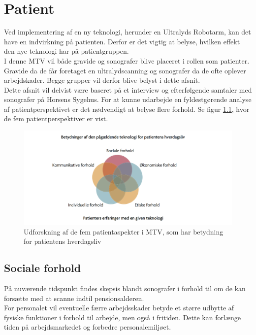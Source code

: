 \chapter{Patient}
Ved implementering af en ny teknologi, herunder en Ultralyds Robotarm, kan det have en indvirkning på patienten. Derfor er det vigtig at belyse, hvilken effekt den nye teknologi har på patientgruppen. \\
I denne MTV vil både gravide og sonografer blive placeret i rollen som patienter. Gravide da de får foretaget en ultralydscanning og sonografer da de ofte oplever arbejdskader. Begge grupper vil derfor blive belyst i dette afsnit.  \\ \newline
Dette afsnit vil delvist være baseret på et interview og efterfølgende samtaler med sonografer på Horsens Sygehus. 
\newline
For at kunne udarbejde en fyldestgørende analyse af patientperspektivet er det nødvendigt at belyse flere forhold. Se figur \ref{patientMTV}, hvor de fem patientperspektiver er vist. 
\begin{figure}[h!]\centering
	\includegraphics[width = 1.0\textwidth]{Figurer/PatientaspekterMTV}
	\caption{Udforskning af de fem patientaspekter i MTV, som har betydning for patientens hverdagsliv}
	\label{patientMTV}
\end{figure}

\section{Sociale forhold}
På nuværende tidspunkt findes skepsis blandt sonografer i forhold til om de kan forsætte med at scanne indtil pensionsalderen. \\ 
For personalet vil eventuelle færre arbejdsskader betyde et større udbytte af fysiske funktioner i forhold til arbejde, men også i fritiden. Dette kan forlænge tiden på arbejdsmarkedet og forbedre personalemiljøet.       

